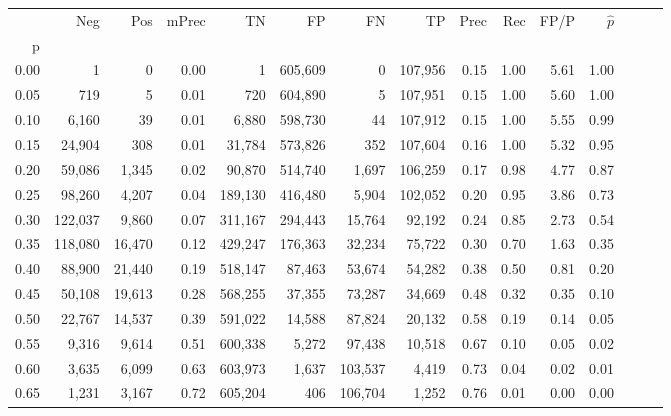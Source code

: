 \begin{tabular}{rrrrrrrrrrrrrrr}
\toprule
{} &      Neg &     Pos & mPrec &       TN &       FP &       FN &       TP &  Prec &   Rec &  FP/P & $\hat{p}$ \\
p    &          &         &       &          &          &          &          &       &       &       &           \\
\midrule
0.00 &        1 &       0 &  0.00 &        1 &  605,609 &        0 &  107,956 &  0.15 &  1.00 &  5.61 &      1.00 \\
0.05 &      719 &       5 &  0.01 &      720 &  604,890 &        5 &  107,951 &  0.15 &  1.00 &  5.60 &      1.00 \\
0.10 &    6,160 &      39 &  0.01 &    6,880 &  598,730 &       44 &  107,912 &  0.15 &  1.00 &  5.55 &      0.99 \\
0.15 &   24,904 &     308 &  0.01 &   31,784 &  573,826 &      352 &  107,604 &  0.16 &  1.00 &  5.32 &      0.95 \\
0.20 &   59,086 &   1,345 &  0.02 &   90,870 &  514,740 &    1,697 &  106,259 &  0.17 &  0.98 &  4.77 &      0.87 \\
0.25 &   98,260 &   4,207 &  0.04 &  189,130 &  416,480 &    5,904 &  102,052 &  0.20 &  0.95 &  3.86 &      0.73 \\
0.30 &  122,037 &   9,860 &  0.07 &  311,167 &  294,443 &   15,764 &   92,192 &  0.24 &  0.85 &  2.73 &      0.54 \\
0.35 &  118,080 &  16,470 &  0.12 &  429,247 &  176,363 &   32,234 &   75,722 &  0.30 &  0.70 &  1.63 &      0.35 \\
0.40 &   88,900 &  21,440 &  0.19 &  518,147 &   87,463 &   53,674 &   54,282 &  0.38 &  0.50 &  0.81 &      0.20 \\
0.45 &   50,108 &  19,613 &  0.28 &  568,255 &   37,355 &   73,287 &   34,669 &  0.48 &  0.32 &  0.35 &      0.10 \\
0.50 &   22,767 &  14,537 &  0.39 &  591,022 &   14,588 &   87,824 &   20,132 &  0.58 &  0.19 &  0.14 &      0.05 \\
0.55 &    9,316 &   9,614 &  0.51 &  600,338 &    5,272 &   97,438 &   10,518 &  0.67 &  0.10 &  0.05 &      0.02 \\
0.60 &    3,635 &   6,099 &  0.63 &  603,973 &    1,637 &  103,537 &    4,419 &  0.73 &  0.04 &  0.02 &      0.01 \\
0.65 &    1,231 &   3,167 &  0.72 &  605,204 &      406 &  106,704 &    1,252 &  0.76 &  0.01 &  0.00 &      0.00 \\

\end{tabular}
